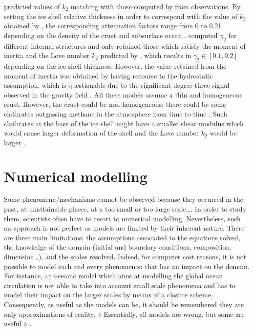  \citet{beuthe2015tidal} predicted values of $k_2$ matching with those computed by \citet{iess2012tides} from observations. By setting the ice shell relative thickness in order to correspond with the value of $k_2$ obtained by \citet{iess2012tides}, the corresponding attenuation factors range from 0 to 0.21 depending on the density of the crust and subsurface ocean \citep[See Fig.~5 in][]{beuthe2015tidal}. \citet{tokano2014numerical} computed $\gamma_2$ for different internal structures and only retained those which satisfy the moment of inertia and the Love number $k_2$ predicted by \citet{iess2012tides}, which results in $\gamma_2\in[0.1,0.2]$ depending on the ice shell thickness. However, the value retained from the moment of inertia was obtained by having recourse to the hydrostatic assumption, which is questionable due to the significant degree-three signal observed in the gravity field \citep{hemingway2013rigid, lefevre2014structure, baland2014titan}. All these models assume a thin and homogeneous crust. However, the crust could be non-homogeneous: there could be some clathrates outgassing methane in the atmosphere from time to time \citep{tobie2006episodic}. Such clathrates at the base of the ice shell might have a smaller shear modulus which would cause larger deformation of the shell and the Love number $k_2$ would be larger \citep{rappaport2008can}.




\section{Numerical modelling} 
Some phenomena/mechanisms cannot be observed because they occurred in the past, at unattainable places, at a too small or too large scale\dots. In order to study them,
scientists often have to resort to numerical modelling. Nevertheless, such an approach is not perfect as models are limited by their inherent nature. There are three main limitations: the assumptions associated to the equations solved, the knowledge of the domain (initial and boundary conditions, composition, dimension\dots), and the scales resolved. Indeed, for computer cost reasons, it is not possible to model each and every phenomenon that has an impact on the domain. For instance, an oceanic model which aims at modelling the global ocean circulation is not able to take into account small scale phenomena and has to model their impact on the larger scales by means of a closure scheme. Consequently, as useful as the models can be, it should be remembered they are only approximations of reality. « Essentially, all models are wrong, but some are useful » \citep{box1987empirical}. 

